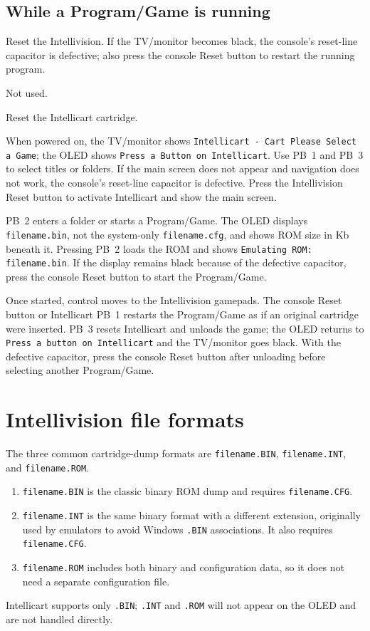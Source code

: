 \documentclass[a4paper,11pt]{article}
\newcommand{\file}[1]{\texttt{#1}}
\begin{document}
\subsection*{While a Program/Game is running}
\begin{description}[style=nextline]
  \item[PB 1] Reset the Intellivision. If the TV/monitor becomes black, the console's reset-line capacitor is defective; also press the console Reset button to restart the running program.
  \item[PB 2] Not used.
  \item[PB 3] Reset the Intellicart cartridge.
\end{description}

When powered on, the TV/monitor shows \texttt{Intellicart - Cart Please Select a Game}; the OLED shows \texttt{Press a Button on Intellicart}. Use PB~1 and PB~3 to select titles or folders. If the main screen does not appear and navigation does not work, the console's reset-line capacitor is defective. Press the Intellivision Reset button to activate Intellicart and show the main screen.

PB~2 enters a folder or starts a Program/Game. The OLED displays \file{filename.bin}, not the system-only \file{filename.cfg}, and shows ROM size in Kb beneath it. Pressing PB~2 loads the ROM and shows \texttt{Emulating ROM: filename.bin}. If the display remains black because of the defective capacitor, press the console Reset button to start the Program/Game.

Once started, control moves to the Intellivision gamepads. The console Reset button or Intellicart PB~1 restarts the Program/Game as if an original cartridge were inserted. PB~3 resets Intellicart and unloads the game; the OLED returns to \texttt{Press a button on Intellicart} and the TV/monitor goes black. With the defective capacitor, press the console Reset button after unloading before selecting another Program/Game.

\section*{Intellivision file formats}
The three common cartridge-dump formats are \file{filename.BIN}, \file{filename.INT}, and \file{filename.ROM}.
\begin{enumerate}
  \item \file{filename.BIN} is the classic binary ROM dump and requires \file{filename.CFG}.
  \item \file{filename.INT} is the same binary format with a different extension, originally used by emulators to avoid Windows \file{.BIN} associations. It also requires \file{filename.CFG}.
  \item \file{filename.ROM} includes both binary and configuration data, so it does not need a separate configuration file.
\end{enumerate}
Intellicart supports only \file{.BIN}; \file{.INT} and \file{.ROM} will not appear on the OLED and are not handled directly.
\end{document}
